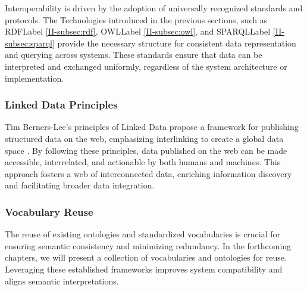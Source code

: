 Interoperability is driven by the adoption of universally recognized standards and protocols. The Technologies introduced in the previous sections, such as \acrshort{RDFLabel} \ref{II-subsec:rdf}, \acrshort{OWLLabel} \ref{II-subsec:owl}, and \acrshort{SPARQLLabel} \ref{II-subsec:sparql} provide the necessary structure for consistent data representation and querying across systems. These standards ensure that data can be interpreted and exchanged uniformly, regardless of the system architecture or implementation.

\subsubsection{Linked Data Principles}\label{II-subsubsec:lod}

Tim Berners-Lee’s principles of Linked Data propose a framework for publishing structured data on the web, emphasizing interlinking to create a global data space \cite{timberners-leeLinkedDataDesign2006}. By following these principles, data published on the web can be made accessible, interrelated, and actionable by both humans and machines. This approach fosters a web of interconnected data, enriching information discovery and facilitating broader data integration.

\subsubsection{Vocabulary Reuse}\label{II-subsubsec:vocabularyReuse}

The reuse of existing ontologies and standardized vocabularies is crucial for ensuring semantic consistency and minimizing redundancy. In the forthcoming chapters, we will present a collection of vocabularies and ontologies for reuse. Leveraging these established frameworks improves system compatibility and aligns semantic interpretations.



